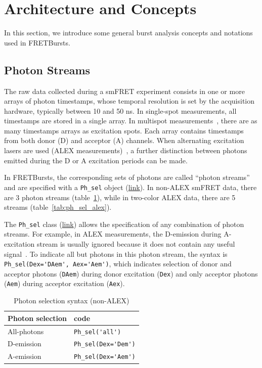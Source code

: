 \documentclass[10pt,letterpaper]{article}
\begin{document}
\section*{Architecture and Concepts}
\label{sec:concepts}

In this section, we introduce some general burst analysis concepts
and notations used in FRETBursts.

\subsection*{Photon Streams}
\label{sec:ph_streams}

The raw data collected during a smFRET experiment consists in one or more arrays of
photon timestamps, whose temporal resolution is set by the acquisition hardware,
typically between 10 and 50 ns.
In single-spot measurements, all timestamps are stored in a single array. In multispot
measurements~\cite{Ingargiola_2013}, there are as many timestamps arrays
as excitation spots.
Each array contains timestamps from both donor (D) and acceptor (A) channels.
When alternating excitation lasers are used (ALEX measurements)~\cite{Lee_2005},
a further distinction between photons emitted during the D or A excitation periods can be made.

In FRETBursts, the corresponding sets of photons are called ``photon streams'' 
and are specified with a \verb|Ph_sel| object
(\href{http://fretbursts.readthedocs.org/en/latest/ph_sel.html}{link}).
In non-ALEX smFRET data, there are 3 photon streams
(table~\ref{tab:ph_sel_smfret}), while in two-color ALEX data, 
there are 5 streams (table~\ref{tab:ph_sel_alex}).

The \verb|Ph_sel| class (\href{http://fretbursts.readthedocs.org/en/latest/ph_sel.html}{link})
allows the specification of any combination of photon streams.
For example, in ALEX measurements, the D-emission during A-excitation stream is
usually ignored because it does not contain any useful signal~\cite{Lee_2005}.
To indicate all but photons in this photon stream, the syntax is
\verb|Ph_sel(Dex='DAem', Aex='Aem')|, which indicates selection of donor
and acceptor photons (\verb|DAem|) during donor excitation (\verb|Dex|) and only acceptor
photons (\verb|Aem|) during acceptor excitation (\verb|Aex|).

\begin{table}
\begin{tabular}{l|l}
  Photon selection  & code \\
  \hline
  All-photons       & \verb|Ph_sel('all')|\\
  D-emission    & \verb|Ph_sel(Dex='Dem')|\\
  A-emission & \verb|Ph_sel(Dex='Aem')|\\
\end{tabular}
\caption{\label{tab:ph_sel_smfret}Photon selection syntax (non-ALEX)}
\end{table}
\end{document}
